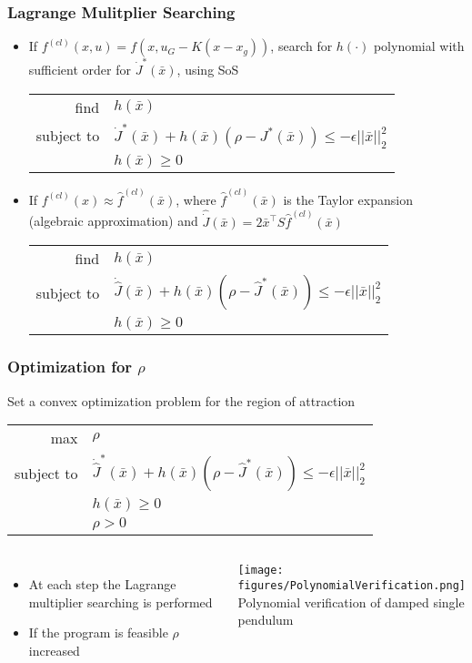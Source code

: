 \documentclass{beamer}
\begin{document}

\begin{frame}
\frametitle{Lagrange Mulitplier Searching}
\begin{itemize}
\item If $f^{(cl)}(x,u)=f(x,u_G-K(x-x_g))$, search for $h(\cdot)$ polynomial with sufficient order for $\dot{J}^{\ast}(\bar{x})$, using SoS
\begin{center}
\begin{tabular}{ r l }
find & $h(\bar{x})$ \\
subject to & $\dot{J}^{\ast}(\bar{x})+ h(\bar{x})(\rho - J^{\ast}(\bar{x}))\leq -\epsilon ||\bar{x}||_2^2$\\
 & $h(\bar{x})\geq 0$
\end{tabular}
\end{center}
\item If $f^{(cl)}(x)\approx \hat{f}^{(cl)}(\bar{x})$, where $\hat{f}^{(cl)}(\bar{x})$ is the Taylor expansion (algebraic approximation) and $\hat{\dot{J}}(\bar{x})=2\bar{x}^{\intercal}S\hat{f}^{(cl)}(\bar{x})$
\begin{center}
\begin{tabular}{ r l }
find & $h(\bar{x})$ \\
subject to & $\dot{\hat{J}}(\bar{x})+ h(\bar{x})(\rho - \hat{J}^{\ast}(\bar{x}))\leq -\epsilon ||\bar{x}||_2^2$\\
 & $h(\bar{x})\geq 0$
\end{tabular}
\end{center}
\end{itemize}

\end{frame}


\begin{frame}
\frametitle{Optimization for $\rho$}
Set a convex optimization problem for the region of attraction 
\begin{center}
\begin{tabular}{ r l }
max & $\rho$ \\
subject to & $\dot{\hat{J}}^{\ast}(\bar{x})+ h(\bar{x})(\rho - \hat{J}^{\ast}(\bar{x}))\leq -\epsilon ||\bar{x}||_2^2$\\
 & $h(\bar{x})\geq 0$\\
 & $\rho>0$
\end{tabular}
\end{center}
\begin{columns}[c] 
\begin{itemize}
\item At each step the Lagrange multiplier searching is performed
\item If the program is feasible $\rho$ increased 
\end{itemize}

\centering
 \texttt{[image: figures/PolynomialVerification.png]}\\
Polynomial verification of damped single pendulum  \cite{p1}
\end{columns}

\end{frame}
\end{document}
